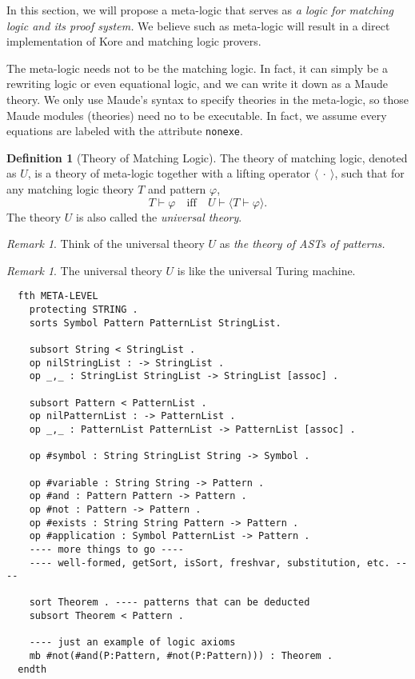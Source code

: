 \documentclass[UTF8]{article}
\newcounter{thmcounter}
\theoremstyle{plain}
\theoremstyle{definition}
\newtheorem{definition}[thmcounter]{Definition}
\theoremstyle{remark}
\newtheorem{remark}[thmcounter]{Remark}
\begin{document}
In this section, we will propose a meta-logic that serves as \emph{a logic for matching logic and its proof system.} We believe such as meta-logic will result in a direct implementation of Kore and matching logic provers. 

The meta-logic needs not to be the matching logic. In fact, it can simply be a rewriting logic or even equational logic, and we can write it down as a Maude theory. We only use Maude's syntax to specify theories in the meta-logic, so those Maude modules (theories) need no to be executable. In fact, we assume every equations are labeled with the attribute \texttt{nonexe}.
\newline

\begin{definition}[Theory of Matching Logic]
	The theory of matching logic, denoted as $U$, is a theory of meta-logic together with a lifting operator $\langle \ \cdot \ \rangle$, such that for any matching logic theory $T$ and pattern $\varphi$, 
	\begin{equation*}
	T \vdash \varphi \quad \text{iff} \quad U \vdash \langle T \vdash \varphi \rangle.
	\end{equation*}
	The theory $U$ is also called the \emph{universal theory}. 
\end{definition}



\begin{remark}
	Think of the universal theory $U$ as \emph{the theory of ASTs of patterns.}
\end{remark}
\begin{remark}
	The universal theory $U$ is like the universal Turing machine.
\end{remark}

\begin{Verbatim}
  fth META-LEVEL
    protecting STRING .
    sorts Symbol Pattern PatternList StringList.
    
    subsort String < StringList .
    op nilStringList : -> StringList .
    op _,_ : StringList StringList -> StringList [assoc] .
    
    subsort Pattern < PatternList .
    op nilPatternList : -> PatternList .
    op _,_ : PatternList PatternList -> PatternList [assoc] .
    
    op #symbol : String StringList String -> Symbol .
    
    op #variable : String String -> Pattern .
    op #and : Pattern Pattern -> Pattern .
    op #not : Pattern -> Pattern .
    op #exists : String String Pattern -> Pattern .
    op #application : Symbol PatternList -> Pattern .
    ---- more things to go ----
    ---- well-formed, getSort, isSort, freshvar, substitution, etc. ----
    
    sort Theorem . ---- patterns that can be deducted
    subsort Theorem < Pattern .
    
    ---- just an example of logic axioms
    mb #not(#and(P:Pattern, #not(P:Pattern))) : Theorem . 
  endth
\end{Verbatim}
\end{document}
